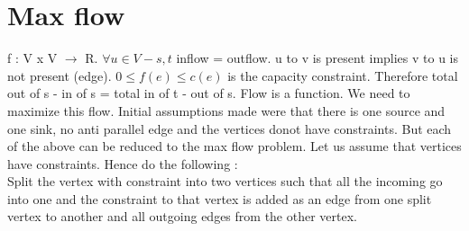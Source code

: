 \documentclass[solution,addpoints,12pt]{exam}
\begin{document}
\section{Max flow}
f : V x V $\rightarrow$ R.
$\forall u \in V - {s, t}$ inflow = outflow. u to v is present implies v to u is not present (edge).
$0 \le f(e) \le c(e)$ is the capacity constraint.
Therefore total out of s - in of s = total in of t - out of s. Flow is a function.
We need to maximize this flow. Initial assumptions made were that there is one source
and one sink, no anti parallel edge and the vertices donot have constraints.
But each of the above can be reduced to the max flow problem.
Let us assume that vertices have constraints. Hence do the following :\\
Split the vertex with constraint into two vertices such that all the incoming go into one and
the constraint to that vertex is added as an edge from one split vertex to another and all outgoing edges from the other vertex.\\
\end{document}
